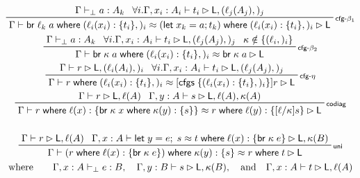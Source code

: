\documentclass[acmsmall,screen,review]{acmart}
\newcommand{\ms}[1]{\ensuremath{\mathsf{#1}}}
\newcommand{\lto}{:}
\newcommand{\letexpr}[3]{\ensuremath{\ms{let}\;#1 = #2;\;#3}}
\newcommand{\letstmt}[3]{\ensuremath{\ms{let}\;#1 = #2; #3}}
\newcommand{\brb}[2]{\ms{br}\;#1\;#2}
\newcommand{\where}[2]{#1\;\ms{where}\;#2}
\newcommand{\wbranch}[3]{#1(#2) \lto \{#3\}}
\newcommand{\cfgsubst}[1]{\ms{cfgs}\;\{#1\}}
\newcommand{\bhyp}[2]{#1 : #2}
\newcommand{\lhyp}[2]{#1(#2)}
\newcommand{\rle}[1]{{\scriptsize\textsf{#1}}}
\newcommand{\hasty}[4]{#1 \vdash_{#2} #3: {#4}}
\newcommand{\haslb}[3]{#1 \vdash #2 \rhd #3}
\newcommand{\teqv}{\approx}
\newcommand{\lbeq}[4]{#1 \vdash #2 \teqv #3 \rhd {#4}}
\begin{document}
\begin{figure}
  \begin{gather*}
      \prftree[r]{\rle{cfg-$\beta_1$}}
        {\hasty{\Gamma}{\bot}{a}{A_k}}
        {\forall i. \haslb{\Gamma, \bhyp{x_i}{A_i}}{t_i}{\ms{L}, (\lhyp{\ell_j}{A_j},)_j}}
        {\lbeq{\Gamma}
          {\where{\brb{\ell_k}{a}}{(\wbranch{\ell_i}{x_i}{t_i},)_i}}
          {\where{(\letstmt{x_k}{a}{t_k})}{(\wbranch{\ell_i}{x_i}{t_i},)_i}}
          {\ms{L}}}
      \\
      \prftree[r]{\rle{cfg-$\beta_2$}}
        {\hasty{\Gamma}{\bot}{a}{A_k}}
        {\forall i. \haslb{\Gamma, \bhyp{x_i}{A_i}}{t_i}{\ms{L}, (\lhyp{\ell_j}{A_j},)_j}}
        {\kappa \notin \{(\ell_i,)_i\}}
        {\lbeq{\Gamma}
          {\where{\brb{\kappa}{a}}{(\wbranch{\ell_i}{x_i}{t_i},)_i}}
          {\brb{\kappa}{a}}
          {\ms{L}}}
      \\
        \prftree[r]{\rle{cfg-$\eta$}}
        {\haslb{\Gamma}{r}{\ms{L}, (\lhyp{\ell_i}{A_i},)_i}}
        {\forall i. \haslb{\Gamma, \bhyp{x_i}{A_i}}{t_i}{\ms{L}, (\lhyp{\ell_j}{A_j},)_j}}
        {
          \lbeq{\Gamma}
            {\where{r}{(\wbranch{\ell_i}{x_i}{t_i},)_i}}
            {[\cfgsubst{(\wbranch{\ell_i}{x_i}{t_i},)_i}]r}
            {\ms{L}}
        }
      \\
      \prftree[r]{\rle{codiag}}
        {\haslb{\Gamma}{r}{\ms{L}, \ell(A)}}
        {\haslb{\Gamma, \bhyp{y}{A}}{s}{\ms{L}, \ell(A), \kappa(A)}}
        {\lbeq{\Gamma}{\where{r}{\wbranch{\ell}{x}{\where{\brb{\kappa}{x}}
          {\wbranch{\kappa}{y}{s}}}}}
        {\where{r}{\wbranch{\ell}{y}{[\ell/\kappa]s}}}
        {\ms{L}}} 
      \\
      \\
      \prftree[r]{\rle{uni}}
        {
          \haslb{\Gamma}{r}{\ms{L}, \ell(A)}
        }
        {
          \lbeq{\Gamma, \bhyp{x}{A}}
            {\letexpr{y}{e}{s}}
            {\where{t}{\wbranch{\ell}{x}{\brb{\kappa}{e}}}}
            {\ms{L}, \kappa(B)}
        }
        {
          \lbeq{\Gamma}
            {\where{(\where{r}{\wbranch{\ell}{x}{\brb{\kappa}{e}}})}
              {\wbranch{\kappa}{y}{s}}}
            {\where{r}{t}}
            {\ms{L}}
        }
      \\
      \text{where} \qquad
      {\hasty{\Gamma, \bhyp{x}{A}}{\bot}{e}{B}}, \quad
      {\haslb{\Gamma, \bhyp{y}{B}}{s}{\ms{L}, \kappa(B)}}, \quad \text{and} \quad
      {\haslb{\Gamma, \bhyp{x}{A}}{t}{\ms{L}, \ell(A)}}
      \\
      \\

\end{gather*}
\end{figure}
\end{document}
